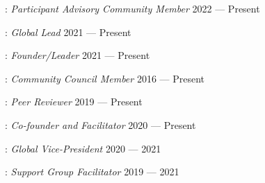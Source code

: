 : \textit{Participant Advisory Community Member}
\hfill 2022 --- Present

: \textit{Global Lead}
\hfill 2021 --- Present

: \textit{Founder/Leader} \hfill 2021 --- Present

:
\textit{Community Council Member} \hfill 2016 --- Present

: \textit{Peer
	Reviewer} \hfill 2019 --- Present

: \textit{Co-founder and Facilitator}
\hfill 2020 --- Present

: \textit{Global Vice-President}
\hfill 2020 --- 2021

: \textit{Support Group Facilitator}
\hfill 2019 --- 2021

